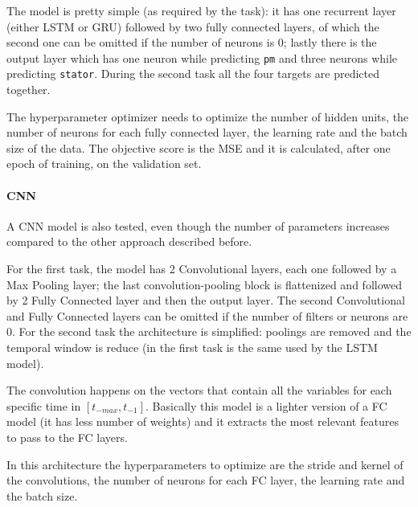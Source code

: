 The model is pretty simple (as required by the task): it has one recurrent layer (either LSTM or GRU) followed by two fully connected layers, of which the second one can be omitted if the number of neurons is 0; lastly there is the output layer which has one neuron while predicting \verb|pm| and three neurons while predicting \verb|stator|.
During the second task all the four targets are predicted together.

The hyperparameter optimizer needs to optimize the number of hidden units, the number of neurons for each fully connected layer, the learning rate and the batch size of the data.
The objective score is the MSE and it is calculated, after one epoch of training, on the validation set.

\paragraph{CNN}
A CNN model is also tested, even though the number of parameters increases compared to the other approach described before.

For the first task, the model has 2 Convolutional layers, each one followed by a Max Pooling layer; the last convolution-pooling block is flattenized and followed by 2 Fully Connected layer and then the output layer. The second Convolutional and Fully Connected layers can be omitted if the number of filters or neurons are 0. For the second task the architecture is simplified: poolings are removed and the temporal window is reduce (in the first task is the same used by the LSTM model).
 
The convolution happens on the vectors that contain all the variables for each specific time in %
$[t_{-max}, t_{-1}]$.
Basically this model is a lighter version of a FC model (it has less number of weights) and it extracts the most relevant features to pass to the FC layers.

In this architecture the hyperparameters to optimize are the stride and kernel of the convolutions, the number of neurons for each FC layer, the learning rate and the batch size.

